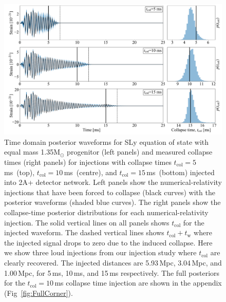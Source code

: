 \documentclass[
reprint,
prd,
twocolumn,
nofootinbib,
tightenlines %
floatfix,
 amsmath,
showpacs ,amssymb, aps,%
superscriptaddress
]{revtex4-1}
\newcommand{\tc}{t_{\mathrm{col}}}
\newcommand{\tw}{t_{\mathrm{w}}}
\begin{document}
    
\begin{figure}[t]
        \centering
        \includegraphics[scale=0.35]{dec_tc10_dist_timeplot_panels.pdf}
        \caption{Time domain posterior waveforms for SLy equation of state with equal mass 1.35M${_\odot}$ progenitor (left panels) and measured collapse times (right panels) for injections with collapse times $\tc=5$\,ms~(top), $\tc=10$\,ms~(centre), and $\tc=15$\,ms~(bottom) injected into 2A+ detector network. Left panels show the numerical-relativity injections that have been forced to collapse (black curves) with the posterior waveforms (shaded blue curves). The right panels show the collapse-time posterior distributions for each numerical-relativity injection.
        The solid vertical lines on all panels shows  $\tc$ for the injected waveform. The dashed vertical lines shows  $\tc+\tw$ where the injected signal drops to zero due to the induced collapse. Here we show three loud injections from our injection study where $\tc$ are clearly recovered. The injected distances are 5.93\,Mpc, 3.04\,Mpc, and 1.00\,Mpc, for 5\,ms,  10\,ms, and  15\,ms respectively. The full posteriors for the $\tc=10\,$ms collapse time   injection are shown in the appendix (Fig~\ref{fig:FullCorner}).} 
        \label{fig:TimeResponse}
\end{figure}     
\end{document}
